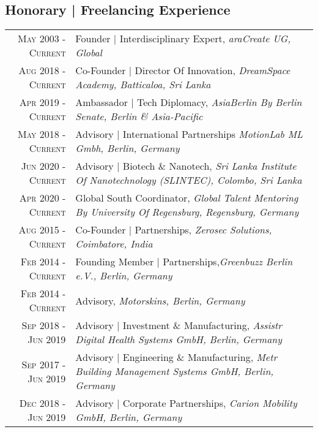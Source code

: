 \subsection{Honorary | Freelancing Experience}
\begin{longtable}
	{r|p{13cm}}
	\textsc{May 2003 - Current} & Founder | Interdisciplinary Expert, \emph{araCreate UG, Global}\\
	\textsc{Aug 2018 - Current} & Co-Founder | Director Of Innovation, \emph{DreamSpace Academy, Batticaloa, Sri Lanka}\\
	\textsc{Apr 2019 - Current} & Ambassador | Tech Diplomacy, \emph{AsiaBerlin By Berlin Senate, Berlin \& Asia-Pacific}\\
	\textsc{May 2018 - Current} & Advisory | International Partnerships \emph{MotionLab ML Gmbh, Berlin, Germany}\\
	\textsc{Jun 2020 - Current} & Advisory | Biotech \& Nanotech, \emph{Sri Lanka Institute Of Nanotechnology (SLINTEC), Colombo, Sri Lanka}\\
	\textsc{Apr 2020 - Current} & Global South Coordinator, \emph{Global Talent Mentoring By University Of Regensburg, Regensburg, Germany}\\
	\textsc{Aug 2015 - Current} & Co-Founder | Partnerships, \emph{Zerosec Solutions, Coimbatore, India}\\
	\textsc{Feb 2014 - Current} & Founding Member | Partnerships,\emph{Greenbuzz Berlin e.V., Berlin, Germany}\\
	\textsc{Feb 2014 - Current} & Advisory, \emph{Motorskins, Berlin, Germany}\\
	\textsc{Sep 2018 - Jun 2019} & Advisory | Investment \& Manufacturing, \emph{Assistr Digital Health Systems GmbH, Berlin, Germany}\\
	\textsc{Sep 2017 - Jun 2019} & Advisory | Engineering \& Manufacturing, \emph{Metr Building Management Systems GmbH, Berlin, Germany}\\
	\textsc{Dec 2018 - Jun 2019} & Advisory | Corporate Partnerships, \emph{Carion Mobility GmbH, Berlin, Germany}\\
\end{longtable}
